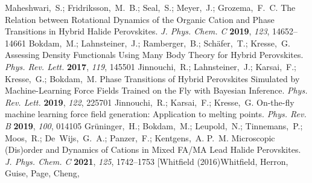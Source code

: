 \documentclass[journal=jpccck,manuscript=article,layout=twocolumn]{achemso}
\begin{document}
\begin{mcitethebibliography}{62}
{\mcitedefaultendpunct}{\mcitedefaultseppunct}\relax
\EndOfBibitem
{}
Maheshwari,~S.; Fridriksson,~M.~B.; Seal,~S.; Meyer,~J.; Grozema,~F.~C. The
  Relation between Rotational Dynamics of the Organic Cation and Phase
  Transitions in Hybrid Halide Perovskites. \emph{J. Phys. Chem. C}
  \textbf{2019}, \emph{123}, 14652--14661\relax
\mciteBstWouldAddEndPuncttrue
\mciteSetBstMidEndSepPunct{\mcitedefaultmidpunct}
{\mcitedefaultendpunct}{\mcitedefaultseppunct}\relax
\EndOfBibitem
{}
Bokdam,~M.; Lahnsteiner,~J.; Ramberger,~B.; Sch\"afer,~T.; Kresse,~G. Assessing
  Density Functionals Using Many Body Theory for Hybrid Perovskites.
  \emph{Phys. Rev. Lett.} \textbf{2017}, \emph{119}, 145501\relax
\mciteBstWouldAddEndPuncttrue
\mciteSetBstMidEndSepPunct{\mcitedefaultmidpunct}
{\mcitedefaultendpunct}{\mcitedefaultseppunct}\relax
\EndOfBibitem
{}
Jinnouchi,~R.; Lahnsteiner,~J.; Karsai,~F.; Kresse,~G.; Bokdam,~M. Phase
  Transitions of Hybrid Perovskites Simulated by Machine-Learning Force Fields
  Trained on the Fly with Bayesian Inference. \emph{Phys. Rev. Lett.}
  \textbf{2019}, \emph{122}, 225701\relax
\mciteBstWouldAddEndPuncttrue
\mciteSetBstMidEndSepPunct{\mcitedefaultmidpunct}
{\mcitedefaultendpunct}{\mcitedefaultseppunct}\relax
\EndOfBibitem
{}
Jinnouchi,~R.; Karsai,~F.; Kresse,~G. On-the-fly machine learning force field
  generation: Application to melting points. \emph{Phys. Rev. B} \textbf{2019},
  \emph{100}, 014105\relax
\mciteBstWouldAddEndPuncttrue
\mciteSetBstMidEndSepPunct{\mcitedefaultmidpunct}
{\mcitedefaultendpunct}{\mcitedefaultseppunct}\relax
\EndOfBibitem
{}
Grüninger,~H.; Bokdam,~M.; Leupold,~N.; Tinnemans,~P.; Moos,~R.;
  De~Wijs,~G.~A.; Panzer,~F.; Kentgens,~A. P.~M. Microscopic (Dis)order and
  Dynamics of Cations in Mixed FA/MA Lead Halide Perovskites. \emph{J. Phys.
  Chem. C} \textbf{2021}, \emph{125}, 1742--1753\relax
\mciteBstWouldAddEndPuncttrue
\mciteSetBstMidEndSepPunct{\mcitedefaultmidpunct}
{\mcitedefaultendpunct}{\mcitedefaultseppunct}\relax
\EndOfBibitem
\bibitem[Whitfield (2016)Whitfield, Herron, Guise, Page, Cheng,

\end{mcitethebibliography}
\end{document}
